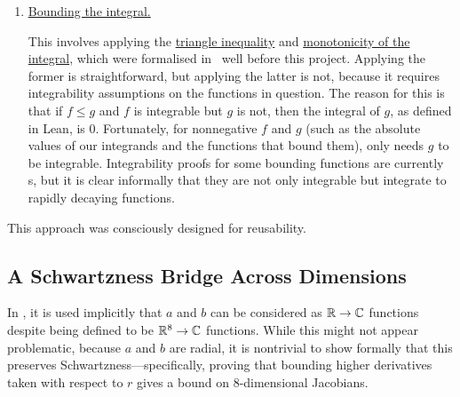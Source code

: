 \begin{enumerate}
    \item \underline{Bounding the integral.}

    This involves applying the \href{https://github.com/leanprover-community/mathlib4/blob/5a2eaa85c555c4263e15928cef249cbaad2eb2d2/Mathlib/MeasureTheory/Integral/Bochner/Basic.lean#L927}{triangle inequality} and \href{https://github.com/leanprover-community/mathlib4/blob/5a2eaa85c555c4263e15928cef249cbaad2eb2d2/Mathlib/MeasureTheory/Integral/Bochner/Set.lean#L645}{monotonicity of the integral}, which were formalised in \mathlib\ well before this project. Applying the former is straightforward, but applying the latter is not, because it requires integrability assumptions on the functions in question. The reason for this is that if $f \leq g$ and $f$ is integrable but $g$ is not, then the integral of $g$, as defined in Lean, is $0$. Fortunately, for nonnegative $f$ and $g$ (such as the absolute values of our integrands and the functions that bound them), only needs $g$ to be integrable. Integrability proofs for some bounding functions are currently \sorry s, but it is clear informally that they are not only integrable but integrate to rapidly decaying functions.
\end{enumerate}

This approach was consciously designed for reusability.

\subsection{A Schwartzness Bridge Across Dimensions}

In \cite{Viazovska8}, it is used implicitly that $a$ and $b$ can be considered as $\mathbb{R} \to \mathbb{C}$ functions despite being defined to be $\mathbb{R}^8 \to \mathbb{C}$ functions. While this might not appear problematic, because $a$ and $b$ are radial, it is nontrivial to show formally that this preserves Schwartzness---specifically, proving that bounding higher derivatives taken with respect to $r$ gives a bound on $8$-dimensional Jacobians.

